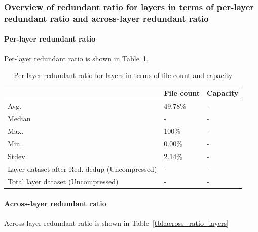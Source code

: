 \subsubsection{Overview of redundant ratio for layers in terms of per-layer redundant ratio and across-layer redundant ratio}

\paragraph{Per-layer redundant ratio} Per-layer redundant ratio is shown in Table~\ref{tbl:per_ratio_layers}.

\begin{table} 
	\centering 
	\scriptsize  
	\caption{Per-layer redundant ratio for layers in terms of file count and capacity} \label{tbl:per_ratio_layers} 
	\begin{tabular}{|l|l|l|}%
		\hline 
		& File count & Capacity \\
		\hline
		Avg. & 49.78\% & -\\
		\hline
		Median & - & - \\
		\hline
		Max. & 100\% & -\\
		\hline
		Min.  & 0.00\%  & -\\
		\hline
		Stdev.  &  2.14\% & -\\
		\hline
		Layer dataset after Red.-dedup (Uncompressed) & -  & -\\
		\hline 
		Total layer dataset (Uncompressed) &  -	& -\\
		\hline 
	\end{tabular} 
\end{table}

\paragraph{Across-layer redundant ratio} Across-layer redundant ratio is shown in Table~\ref{tbl:across_ratio_layers}

